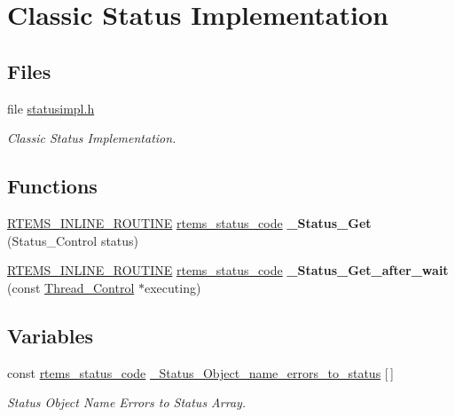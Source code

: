 \hypertarget{group__ClassicStatusImpl}{}\section{Classic Status Implementation}
\label{group__ClassicStatusImpl}
\subsection*{Files}
\begin{DoxyCompactItemize}
\item 
file \mbox{\hyperlink{statusimpl_8h}{statusimpl.\+h}}
\begin{DoxyCompactList}\small\item\em Classic Status Implementation. \end{DoxyCompactList}\end{DoxyCompactItemize}
\subsection*{Functions}
\begin{DoxyCompactItemize}
\item 
\mbox{\label{group__ClassicStatusImpl_ga6ffec3b1e02d7cdd31a7db140a4d6236}} 
\mbox{\hyperlink{group__RTEMSScoreBaseDefs_gac216239df231d5dbd15e3520b0b9313f}{R\+T\+E\+M\+S\+\_\+\+I\+N\+L\+I\+N\+E\+\_\+\+R\+O\+U\+T\+I\+NE}} \mbox{\hyperlink{group__ClassicStatus_ga545d41846817eaba6143d52ee4d9e9fe}{rtems\+\_\+status\+\_\+code}} {\bfseries \+\_\+\+Status\+\_\+\+Get} (Status\+\_\+\+Control status)
\item 
\mbox{\label{group__ClassicStatusImpl_ga03ce0f56fc1403e7361719a4c52232cd}} 
\mbox{\hyperlink{group__RTEMSScoreBaseDefs_gac216239df231d5dbd15e3520b0b9313f}{R\+T\+E\+M\+S\+\_\+\+I\+N\+L\+I\+N\+E\+\_\+\+R\+O\+U\+T\+I\+NE}} \mbox{\hyperlink{group__ClassicStatus_ga545d41846817eaba6143d52ee4d9e9fe}{rtems\+\_\+status\+\_\+code}} {\bfseries \+\_\+\+Status\+\_\+\+Get\+\_\+after\+\_\+wait} (const \mbox{\hyperlink{struct__Thread__Control}{Thread\+\_\+\+Control}} $\ast$executing)
\end{DoxyCompactItemize}
\subsection*{Variables}
\begin{DoxyCompactItemize}
\item 
const \mbox{\hyperlink{group__ClassicStatus_ga545d41846817eaba6143d52ee4d9e9fe}{rtems\+\_\+status\+\_\+code}} \mbox{\hyperlink{group__ClassicStatusImpl_gaefbdceb4ff8e9f3fe7e0439a87f1b882}{\+\_\+\+Status\+\_\+\+Object\+\_\+name\+\_\+errors\+\_\+to\+\_\+status}} \mbox{[}$\,$\mbox{]}
\begin{DoxyCompactList}\small\item\em Status Object Name Errors to Status Array. \end{DoxyCompactList}\end{DoxyCompactItemize}


